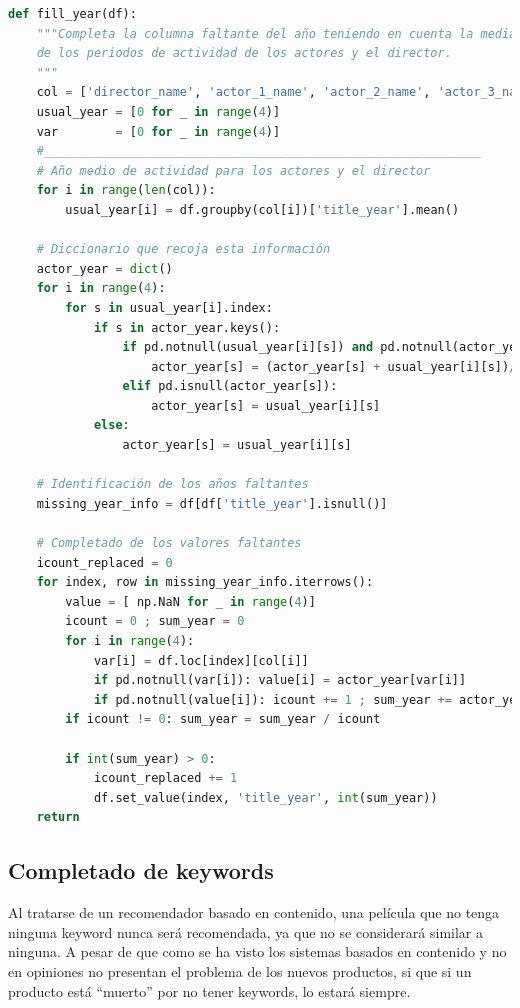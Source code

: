 \begin{lstlisting}[language=Python, caption={Completado de la variable año en el dataset utilizando el promedio de los años de las películas de su director y actores principales.}]
def fill_year(df):
    """Completa la columna faltante del año teniendo en cuenta la media
    de los periodos de actividad de los actores y el director.
    """
    col = ['director_name', 'actor_1_name', 'actor_2_name', 'actor_3_name']
    usual_year = [0 for _ in range(4)]
    var        = [0 for _ in range(4)]
    #_____________________________________________________________
    # Año medio de actividad para los actores y el director
    for i in range(len(col)):
        usual_year[i] = df.groupby(col[i])['title_year'].mean()

    # Diccionario que recoja esta información
    actor_year = dict()
    for i in range(4):
        for s in usual_year[i].index:
            if s in actor_year.keys():
                if pd.notnull(usual_year[i][s]) and pd.notnull(actor_year[s]):
                    actor_year[s] = (actor_year[s] + usual_year[i][s])/2
                elif pd.isnull(actor_year[s]):
                    actor_year[s] = usual_year[i][s]
            else:
                actor_year[s] = usual_year[i][s]

    # Identificación de los años faltantes
    missing_year_info = df[df['title_year'].isnull()]

    # Completado de los valores faltantes
    icount_replaced = 0
    for index, row in missing_year_info.iterrows():
        value = [ np.NaN for _ in range(4)]
        icount = 0 ; sum_year = 0
        for i in range(4):            
            var[i] = df.loc[index][col[i]]
            if pd.notnull(var[i]): value[i] = actor_year[var[i]]
            if pd.notnull(value[i]): icount += 1 ; sum_year += actor_year[var[i]]
        if icount != 0: sum_year = sum_year / icount 

        if int(sum_year) > 0:
            icount_replaced += 1
            df.set_value(index, 'title_year', int(sum_year))
    return
\end{lstlisting}


\subsection{Completado de keywords}

Al tratarse de un recomendador basado en contenido, una película que no tenga ninguna keyword nunca será recomendada, ya que no se considerará similar a ninguna. A pesar de que como se ha visto los sistemas basados en contenido y no en opiniones no presentan el problema de los nuevos productos, si que si un producto está ``muerto'' por no tener keywords, lo estará siempre.\\

